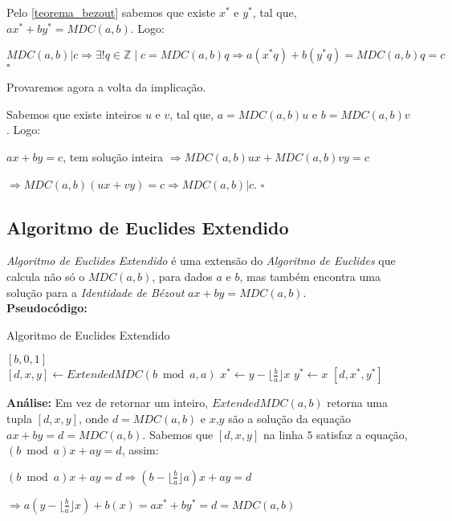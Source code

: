Pelo \autoref{teorema_bezout} sabemos que existe $x^*$ e $y^*$, tal que, $ax^* + by^* = MDC(a,b)$. Logo:

$MDC(a,b)|c \Rightarrow \exists! q\in\mathbb{Z} \mid c = MDC(a,b)q \Rightarrow a(x^*q) + b(y^*q) = MDC(a,b)q = c$ $\square$

Provaremos agora a volta da implicação.

Sabemos que existe inteiros $u$ e $v$, tal que, $a=MDC(a,b)u$ e $b=MDC(a,b)v$. Logo:

$ax + by=c$, tem solução inteira $\Rightarrow MDC(a,b)ux + MDC(a,b)vy = c$

$\Rightarrow MDC(a,b)(ux + vy) = c \Rightarrow MDC(a,b)|c$. $\square$ 



\subsection{Algoritmo de Euclides Extendido}

\textit{Algoritmo de Euclides Extendido} é uma extensão do \textit{Algoritmo de Euclides} que calcula não só o $MDC(a,b)$, para dados $a$ e $b$, mas também encontra
uma solução para a \textit{Identidade de Bézout} $ax+by = MDC(a,b)$. 
\\

\textbf{Pseudocódigo:}
\begin{algorithm}
\caption{Algoritmo de Euclides Extendido}\label{mdc_extended}
\begin{algorithmic}[1]
\State \Return $[b,0,1]$
\EndIf
\\
\State $[d,x,y] \gets ExtendedMDC(b \bmod a, a)$
\State $x^* \gets y - \lfloor \frac{b}{a} \rfloor x$
\State $y^* \gets x$
\State \Return $[d,x^*,y^*]$
\EndProcedure
\end{algorithmic}
\end{algorithm}

\textbf{Análise:}
Em vez de retornar um inteiro, $ExtendedMDC(a,b)$ retorna uma tupla $[d,x,y]$, onde $d=MDC(a,b)$ e $x$,$y$ são a solução da equação $ax+by=d=MDC(a,b)$.
Sabemos que $[d,x,y]$ na linha $5$ satisfaz a equação, $(b\bmod a)x + ay = d$, assim:

$(b\bmod a)x + ay = d \Rightarrow (b - \lfloor \frac{b}{a} \rfloor a)x + ay = d$

$\Rightarrow a(y-\lfloor \frac{b}{a} \rfloor x) + b(x) = ax^* + by^* = d = MDC(a,b)$

